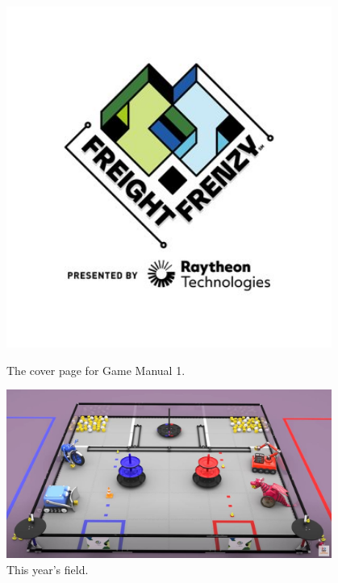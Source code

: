 \begin{figure}[ht]
\centering
\begin{minipage}[b]{.48\textwidth}
  \centering
  \includegraphics[width=0.95\textwidth]{Meetings/September/09-21-21/9-18-21_Team_Image1 - Nathan Forrer.jpg}
  \caption{The cover page for Game Manual 1.}
  \label{fig:092122_1}
\end{minipage}%
\hfill%
\begin{minipage}[b]{.48\textwidth}
  \centering
  \includegraphics[width=0.95\textwidth]{Meetings/September/09-21-21/9-18-21_Team_Image2 - Nathan Forrer.jpg}
  \caption{This year's field.}
  \label{fig:092122_2}
\end{minipage}
\end{figure}

